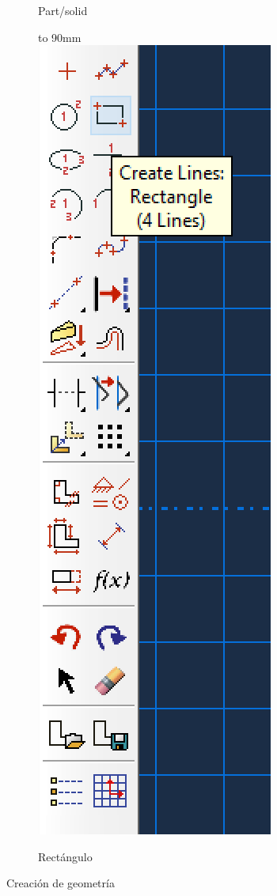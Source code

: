 \documentclass[spanish,a4paper,12pt]{article}
\def\imagebox#1#2{\vtop to #1{\null\hbox{#2}\vfill}}
\begin{document}
\begin{figure}[h!tp]
\begin{subfigure}[b]{0.38\textwidth}
    \caption{Part/solid\label{fig:bar1a}}
  \end{subfigure}
  \begin{subfigure}[b]{0.25\textwidth}
  \hspace{6mm}
    \imagebox{90mm}{\includegraphics[scale=0.5]{capturas/rectangulo.png}}
    \caption{Rectángulo\label{fig:bar1b}}
  \end{subfigure}
\caption{Creación de geometría}
\label{fig:bar1}
\end{figure}
\end{document}
